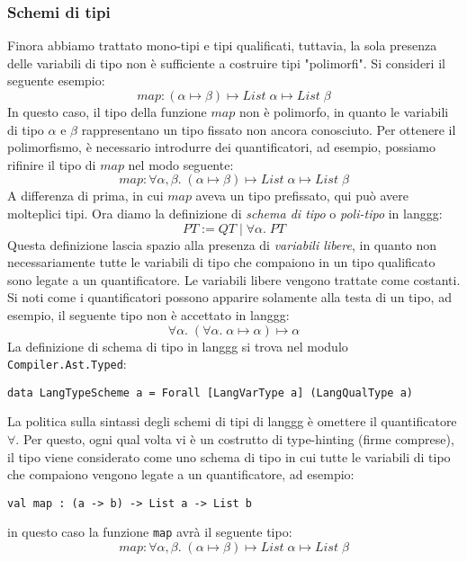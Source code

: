 \documentclass[10pt,a4paper]{article}
\begin{document}
\subsubsection{Schemi di tipi}
Finora abbiamo trattato mono-tipi e tipi qualificati, tuttavia, la sola presenza delle variabili di tipo non è sufficiente
a costruire tipi "polimorfi". Si consideri il seguente esempio:
\[ map : (\alpha \mapsto \beta) \mapsto List \; \alpha \mapsto List \; \beta \]
In questo caso, il tipo della funzione $ map $ non è polimorfo, in quanto le variabili di tipo $ \alpha $ e $ \beta $
rappresentano un tipo fissato non ancora conosciuto. Per ottenere il polimorfismo, è necessario introdurre
dei quantificatori, ad esempio, possiamo rifinire il tipo di $ map $ nel modo seguente:
\[ map : \forall \alpha, \beta . \; (\alpha \mapsto \beta) \mapsto List \; \alpha \mapsto List \; \beta \]
A differenza di prima, in cui $ map $ aveva un tipo prefissato, qui può avere molteplici tipi. Ora diamo la definizione
di \textit{schema di tipo} o \textit{poli-tipo} in langgg:
\[ PT := QT \; | \; \forall \alpha. \; PT \]
Questa definizione lascia spazio alla presenza di \textit{variabili libere}, in quanto non necessariamente tutte le
variabili di tipo che compaiono in un tipo qualificato sono legate a un quantificatore. Le variabili libere vengono
trattate come costanti. Si noti come i quantificatori possono apparire solamente alla testa di un tipo, ad esempio, il
seguente tipo non è accettato in langgg:
\[ \forall \alpha . \; (\forall \alpha . \; \alpha \mapsto \alpha) \mapsto \alpha \]
La definizione di schema di tipo in langgg si trova nel modulo \texttt{Compiler.Ast.Typed}:
\begin{lstlisting}
data LangTypeScheme a = Forall [LangVarType a] (LangQualType a)
\end{lstlisting}
La politica sulla sintassi degli schemi di tipi di langgg è omettere il quantificatore $ \forall $. Per questo, ogni qual
volta vi è un costrutto di type-hinting (firme comprese), il tipo viene considerato come uno schema di tipo in cui tutte
le variabili di tipo che compaiono vengono legate a un quantificatore, ad esempio:
\begin{lstlisting}
val map : (a -> b) -> List a -> List b
\end{lstlisting}
in questo caso la funzione \texttt{map} avrà il seguente tipo:
\[ map : \forall \alpha, \beta . \; (\alpha \mapsto \beta) \mapsto List \; \alpha \mapsto List \; \beta \]
\end{document}
